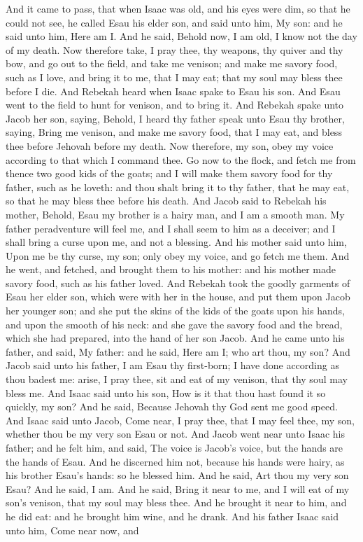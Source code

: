 And it came to pass, that when Isaac was old, and his eyes were dim, so that he could not see, he called Esau his elder son, and said unto him, My son: and he said unto him, Here am I. And he said, Behold now, I am old, I know not the day of my death. Now therefore take, I pray thee, thy weapons, thy quiver and thy bow, and go out to the field, and take me venison; and make me savory food, such as I love, and bring it to me, that I may eat; that my soul may bless thee before I die.  And Rebekah heard when Isaac spake to Esau his son. And Esau went to the field to hunt for venison, and to bring it. And Rebekah spake unto Jacob her son, saying, Behold, I heard thy father speak unto Esau thy brother, saying, Bring me venison, and make me savory food, that I may eat, and bless thee before Jehovah before my death. Now therefore, my son, obey my voice according to that which I command thee. Go now to the flock, and fetch me from thence two good kids of the goats; and I will make them savory food for thy father, such as he loveth: and thou shalt bring it to thy father, that he may eat, so that he may bless thee before his death. And Jacob said to Rebekah his mother, Behold, Esau my brother is a hairy man, and I am a smooth man. My father peradventure will feel me, and I shall seem to him as a deceiver; and I shall bring a curse upon me, and not a blessing. And his mother said unto him, Upon me be thy curse, my son; only obey my voice, and go fetch me them. And he went, and fetched, and brought them to his mother: and his mother made savory food, such as his father loved. And Rebekah took the goodly garments of Esau her elder son, which were with her in the house, and put them upon Jacob her younger son; and she put the skins of the kids of the goats upon his hands, and upon the smooth of his neck: and she gave the savory food and the bread, which she had prepared, into the hand of her son Jacob.  And he came unto his father, and said, My father: and he said, Here am I; who art thou, my son? And Jacob said unto his father, I am Esau thy first-born; I have done according as thou badest me: arise, I pray thee, sit and eat of my venison, that thy soul may bless me. And Isaac said unto his son, How is it that thou hast found it so quickly, my son? And he said, Because Jehovah thy God sent me good speed. And Isaac said unto Jacob, Come near, I pray thee, that I may feel thee, my son, whether thou be my very son Esau or not. And Jacob went near unto Isaac his father; and he felt him, and said, The voice is Jacob’s voice, but the hands are the hands of Esau. And he discerned him not, because his hands were hairy, as his brother Esau’s hands: so he blessed him. And he said, Art thou my very son Esau? And he said, I am. And he said, Bring it near to me, and I will eat of my son’s venison, that my soul may bless thee. And he brought it near to him, and he did eat: and he brought him wine, and he drank. And his father Isaac said unto him, Come near now, and 